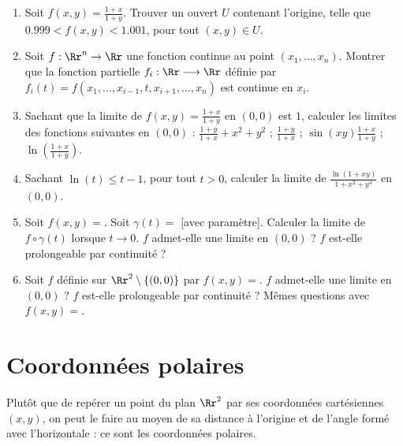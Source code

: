 \documentclass[12pt, class=report,crop=false]{standalone}
\begin{document}
\begin{miniexercices}
\sauteligne
\begin{enumerate}
  \item Soit $f(x,y) = \frac{1+x}{1+y}$. Trouver un ouvert $U$ contenant l'origine, telle que 
  $0.999 < f(x,y) < 1.001$, pour tout $(x,y) \in U$.

  \item Soit $f : \Rr^n \rightarrow \Rr$ une fonction continue au point $(x_1,\ldots,x_n)$.
  Montrer que la fonction partielle $f_i : \Rr \longrightarrow \Rr$ définie par 
  $f_i(t) = f(x_1,\ldots,x_{i-1},t,x_{i+1},\ldots,x_n)$ est continue en $x_i$.
  
  \item Sachant que la limite de $f(x,y) = \frac{1+x}{1+y}$ en $(0,0)$ est $1$, calculer les limites des fonctions suivantes en $(0,0)$ :
 $\frac{1+y}{1+x}+ x^2+y^2$ ; $\frac{1+y}{1+x}$ ;  $\sin(xy)\frac{1+x}{1+y}$ ; $\ln\left(\frac{1+x}{1+y}\right)$.
  
  \item Sachant $\ln(t) \le t-1$, pour tout $t>0$, calculer la limite de $\frac{\ln(1+xy)}{1+x^2+y^4}$ en $(0,0)$. 
  
  \item Soit $f(x,y)= $. Soit $\gamma(t) = $ [avec paramètre]. Calculer la limite de $f \circ \gamma(t)$ lorsque $t\to0$. $f$ admet-elle une limite en $(0,0)$ ?  $f$ est-elle prolongeable par continuité ? 
  
  
  \item Soit $f$ définie sur $\Rr^2\setminus \{ (0,0) \}$ par 
  $f(x,y) = $. 
  $f$ admet-elle une limite en $(0,0)$ ? 
  $f$ est-elle prolongeable par continuité ? 
  Mêmes questions avec $f(x,y)=$.
  
\end{enumerate}
\end{miniexercices}


\section{Coordonnées polaires}


Plutôt que de repérer un point du plan $\Rr^2$ par ses coordonnées cartésiennes $(x,y)$, 
on peut le faire au moyen de sa distance à l'origine et de l'angle formé avec l'horizontale : ce sont les coordonnées polaires.


\end{document}

